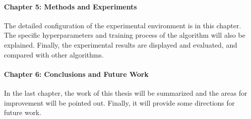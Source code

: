 \paragraph{Chapter 5: Methods and Experiments}
The detailed configuration of the experimental environment is in this chapter. The specific hyperparameters and training process of the algorithm will also be explained. Finally, the experimental results are displayed and evaluated, and compared with other algorithms. 

\paragraph{Chapter 6: Conclusions and Future Work}
In the last chapter, the work of this thesis will be summarized and the areas for improvement will be pointed out. Finally, it will provide some directions for future work.